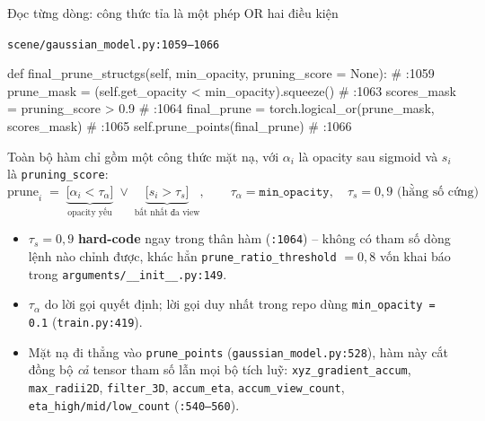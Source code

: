 \begin{frame}[fragile]{Đọc từng dòng: công thức tỉa là một phép OR hai điều kiện}
\scriptsize
\begin{block}{\texttt{scene/gaussian\_model.py:1059--1066}}
\begin{semiverbatim}
def final_prune_structgs(self, min_opacity, pruning_score = None):   # :1059
    prune_mask  = (self.get_opacity < min_opacity).squeeze()         # :1063
    scores_mask = pruning_score > 0.9                                # :1064
    final_prune = torch.logical_or(prune_mask, scores_mask)          # :1065
    self.prune_points(final_prune)                                   # :1066
\end{semiverbatim}
\end{block}
\footnotesize
Toàn bộ hàm chỉ gồm một công thức mặt nạ, với $\alpha_i$ là opacity sau sigmoid và $s_i$ là \texttt{pruning\_score}:
\[
\text{prune}_i \;=\; \underbrace{\big[\alpha_i < \tau_\alpha\big]}_{\text{opacity yếu}} \;\vee\; \underbrace{\big[s_i > \tau_s\big]}_{\text{bất nhất đa view}},\qquad \tau_\alpha = \texttt{min\_opacity},\quad \tau_s = 0{,}9 \text{ (hằng số cứng)}
\]
\begin{itemize}\scriptsize
    \item $\tau_s = 0{,}9$ \textbf{hard-code} ngay trong thân hàm (\texttt{:1064}) -- không có tham số dòng lệnh nào chỉnh được, khác hẳn \texttt{prune\_ratio\_threshold} $=0{,}8$ vốn khai báo trong \texttt{arguments/\_\_init\_\_.py:149}.
    \item $\tau_\alpha$ do lời gọi quyết định; lời gọi duy nhất trong repo dùng \texttt{min\_opacity = 0.1} (\texttt{train.py:419}).
    \item Mặt nạ đi thẳng vào \texttt{prune\_points} (\texttt{gaussian\_model.py:528}), hàm này cắt đồng bộ \emph{cả} tensor tham số lẫn mọi bộ tích luỹ: \texttt{xyz\_gradient\_accum}, \texttt{max\_radii2D}, \texttt{filter\_3D}, \texttt{accum\_eta}, \texttt{accum\_view\_count}, \texttt{eta\_high/mid/low\_count} (\texttt{:540--560}).
\end{itemize}
\end{frame}

